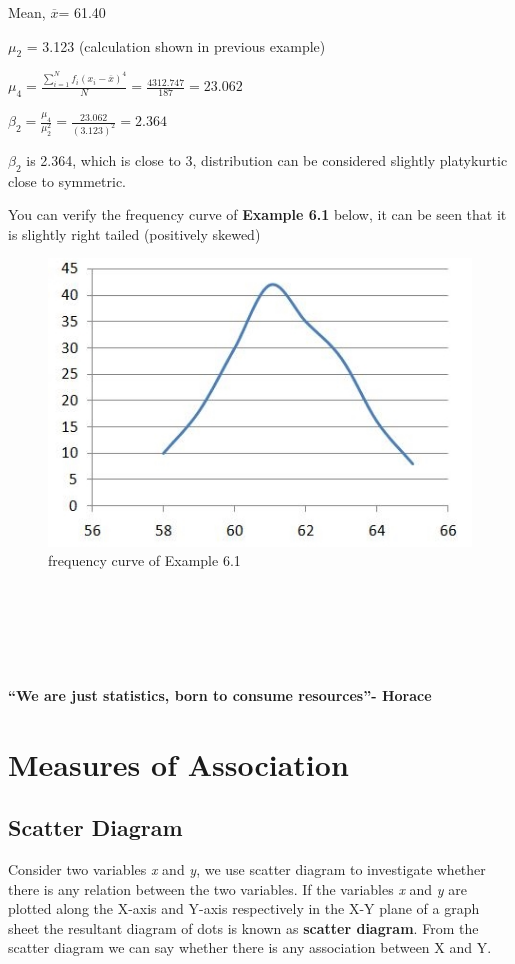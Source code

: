 \documentclass[
]{book}
\begin{document}
Mean, \(\overline{x}\)= 61.40

\(\mu_{2}\) = 3.123 (calculation shown in previous example)

\(\mu_{4} = \frac{\sum_{i = 1}^{N}{f_{i}\left( x_{i} - \overline{x} \right)^{4}}}{N} = \frac{4312.747}{187} = 23.062\)

\(\beta_{2} = \frac{\mu_{4}}{\mu_{2}^{2}} = \frac{23.062}{\left( 3.123 \right)^{2}} = 2.364\)

\(\beta_{2}\) is 2.364, which is close to 3, distribution can be considered slightly platykurtic close to symmetric.

You can verify the frequency curve of \textbf{Example 6.1} below, it can be seen that it is slightly right tailed (positively skewed)

\begin{figure}

{\centering \includegraphics[width=0.5\linewidth]{images/image11_5} 

}

\caption{frequency curve of Example 6.1}\label{fig:k2}
\end{figure}

~\\
\strut ~\\
\strut ~

\label{hello}
\textbf{``We are just statistics, born to consume resources''- Horace}

\chapter{Measures of Association}\label{measures-of-association}

\section{Scatter Diagram}\label{scatter-diagram}

Consider two variables \emph{x} and \emph{y}, we use scatter diagram to
investigate whether there is any relation between the two variables. If
the variables \emph{x} and \emph{y} are plotted along the X-axis and Y-axis
respectively in the X-Y plane of a graph sheet the resultant diagram of
dots is known as \textbf{scatter diagram}. From the scatter diagram we can
say whether there is any association between X and Y.
\end{document}
